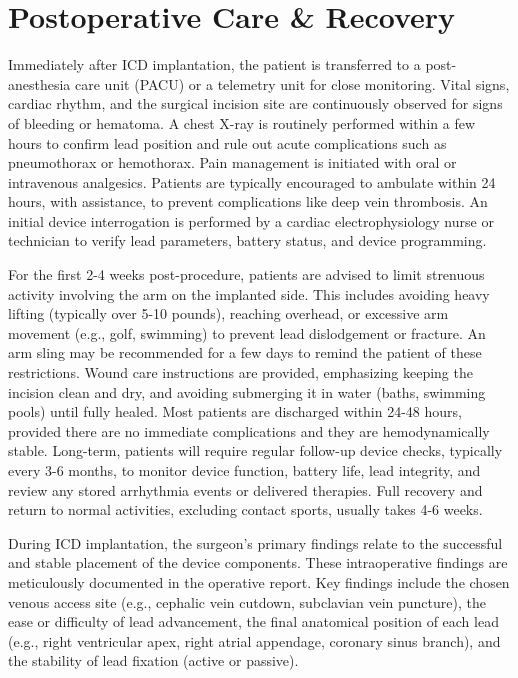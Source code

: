 \section*{Postoperative Care \& Recovery}
Immediately after ICD implantation, the patient is transferred to a post-anesthesia care unit (PACU) or a telemetry unit for close monitoring. Vital signs, cardiac rhythm, and the surgical incision site are continuously observed for signs of bleeding or hematoma. A chest X-ray is routinely performed within a few hours to confirm lead position and rule out acute complications such as pneumothorax or hemothorax. Pain management is initiated with oral or intravenous analgesics. Patients are typically encouraged to ambulate within 24 hours, with assistance, to prevent complications like deep vein thrombosis. An initial device interrogation is performed by a cardiac electrophysiology nurse or technician to verify lead parameters, battery status, and device programming.

For the first 2-4 weeks post-procedure, patients are advised to limit strenuous activity involving the arm on the implanted side. This includes avoiding heavy lifting (typically over 5-10 pounds), reaching overhead, or excessive arm movement (e.g., golf, swimming) to prevent lead dislodgement or fracture. An arm sling may be recommended for a few days to remind the patient of these restrictions. Wound care instructions are provided, emphasizing keeping the incision clean and dry, and avoiding submerging it in water (baths, swimming pools) until fully healed. Most patients are discharged within 24-48 hours, provided there are no immediate complications and they are hemodynamically stable. Long-term, patients will require regular follow-up device checks, typically every 3-6 months, to monitor device function, battery life, lead integrity, and review any stored arrhythmia events or delivered therapies. Full recovery and return to normal activities, excluding contact sports, usually takes 4-6 weeks.

During ICD implantation, the surgeon's primary findings relate to the successful and stable placement of the device components. These intraoperative findings are meticulously documented in the operative report. Key findings include the chosen venous access site (e.g., cephalic vein cutdown, subclavian vein puncture), the ease or difficulty of lead advancement, the final anatomical position of each lead (e.g., right ventricular apex, right atrial appendage, coronary sinus branch), and the stability of lead fixation (active or passive). 

